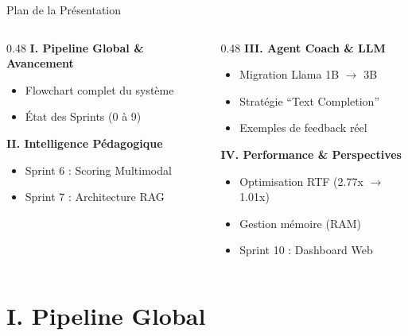 \documentclass[10pt,aspectratio=169]{beamer}
\begin{document}
\begin{frame}{Plan de la Présentation}
    \begin{columns}[T]
        \begin{column}{0.48\textwidth}
            \textbf{\textcolor{primary}{I. Pipeline Global \& Avancement}}
            \begin{itemize} \small
                \item Flowchart complet du système
                \item État des Sprints (0 à 9)
            \end{itemize}
            \vspace{0.4cm}
            \textbf{\textcolor{primary}{II. Intelligence Pédagogique}}
            \begin{itemize} \small
                \item Sprint 6 : Scoring Multimodal
                \item Sprint 7 : Architecture RAG
            \end{itemize}
        \end{column}
        \begin{column}{0.48\textwidth}
            \textbf{\textcolor{accent}{III. Agent Coach \& LLM}}
            \begin{itemize} \small
                \item Migration Llama 1B $\rightarrow$ 3B
                \item Stratégie ``Text Completion''
                \item Exemples de feedback réel
            \end{itemize}
            \vspace{0.4cm}
            \textbf{\textcolor{success}{IV. Performance \& Perspectives}}
            \begin{itemize} \small
                \item Optimisation RTF (2.77x $\rightarrow$ 1.01x)
                \item Gestion mémoire (RAM)
                \item Sprint 10 : Dashboard Web
            \end{itemize}
        \end{column}
    \end{columns}
\end{frame}

\section{I. Pipeline Global}
\end{document}

